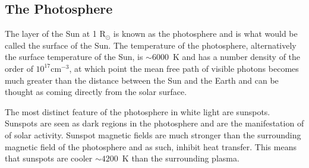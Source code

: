 \subsection{The Photosphere}
The layer of the Sun at 1 R$_{\odot}$ is known as the photosphere and is what would be called the surface of the Sun. The temperature of the photosphere, alternatively the surface temperature of the Sun, is $\sim 6000$~K and has a number density of the order of $10^{17} \mbox{cm}^{-3}$, at which point the mean free path of visible photons becomes much greater than the distance between the Sun and the Earth and can be thought as coming directly from the solar surface.

The most distinct feature of the photosphere in white light are sunspots. Sunspots are seen as dark regions in the photosphere and are the manifestation of of solar activity. Sunspot magnetic fields are much stronger than the surrounding magnetic field of the photosphere and as such, inhibit heat transfer. This means that sunspots are cooler $\sim 4200$~K \citep{McLean1985} than the surrounding plasma.

